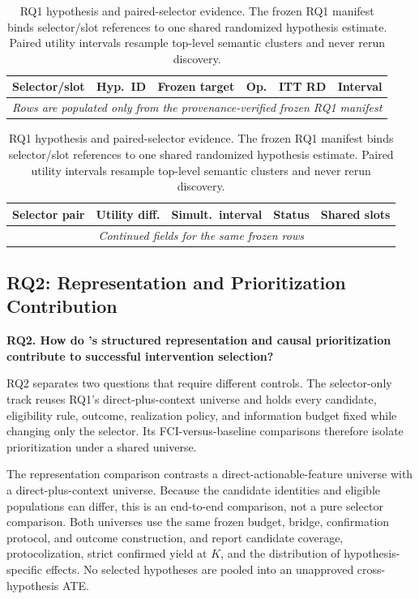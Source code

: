 \begin{table}[H]
  \centering
  \small
  \caption{RQ1 hypothesis and paired-selector evidence. The frozen RQ1
  manifest binds selector/slot references to one shared randomized hypothesis
  estimate. Paired utility intervals resample top-level semantic clusters and
  never rerun discovery.}
  \label{tab:rq1-evidence}
  \begin{tabular}{llllrr}
    \toprule
    Selector/slot & Hyp.\ ID & Frozen target & Op. & ITT RD & Interval \\
    \midrule
    \multicolumn{6}{c}{\emph{Rows are populated only from the
    provenance-verified frozen RQ1 manifest}} \\
    \bottomrule
  \end{tabular}

  \medskip
  \begin{tabular}{llrrl}
    \toprule
    Selector pair & Utility diff. & Simult.\ interval & Status & Shared slots \\
    \midrule
    \multicolumn{5}{c}{\emph{Continued fields for the same frozen rows}} \\
    \bottomrule
  \end{tabular}
\end{table}

\subsection{RQ2: Representation and Prioritization Contribution}

\textbf{RQ2. How do \model's structured representation and causal
prioritization contribute to successful intervention selection?}

RQ2 separates two questions that require different controls. The selector-only
track reuses RQ1's direct-plus-context universe and holds every candidate,
eligibility rule, outcome, realization policy, and information budget fixed
while changing only the selector. Its FCI-versus-baseline comparisons therefore
isolate prioritization under a shared universe.

The representation comparison contrasts a direct-actionable-feature universe
with a direct-plus-context universe. Because the candidate identities and
eligible populations can differ, this is an end-to-end comparison, not a pure
selector comparison. Both universes use the same frozen budget, bridge,
confirmation protocol, and outcome construction, and report candidate
coverage, protocolization, strict confirmed yield at $K$, and the distribution
of hypothesis-specific effects. No selected hypotheses are pooled into an
unapproved cross-hypothesis ATE.

